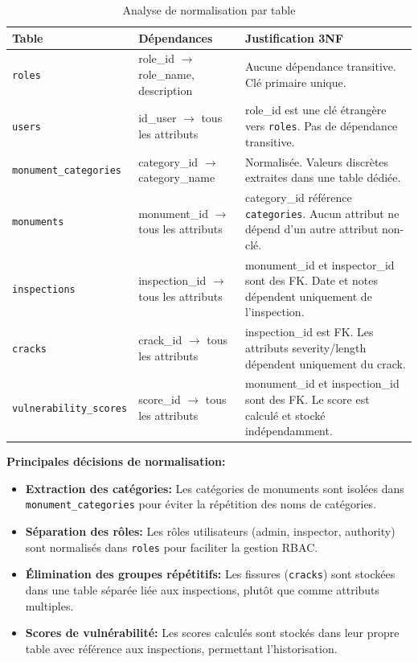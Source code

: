 \documentclass[12pt,a4paper]{article}
\begin{document}
\begin{table}[H]
\centering
\caption{Analyse de normalisation par table}
\label{tab:3nf-analysis}
\begin{tabular}{|p{3.5cm}|p{4cm}|p{5cm}|}
\hline
\textbf{Table} & \textbf{Dépendances} & \textbf{Justification 3NF} \\
\hline
\texttt{roles} & role\_id $\rightarrow$ role\_name, description & Aucune dépendance transitive. Clé primaire unique. \\
\hline
\texttt{users} & id\_user $\rightarrow$ tous les attributs & role\_id est une clé étrangère vers \texttt{roles}. Pas de dépendance transitive. \\
\hline
\texttt{monument\_categories} & category\_id $\rightarrow$ category\_name & Normalisée. Valeurs discrètes extraites dans une table dédiée. \\
\hline
\texttt{monuments} & monument\_id $\rightarrow$ tous les attributs & category\_id référence \texttt{categories}. Aucun attribut ne dépend d'un autre attribut non-clé. \\
\hline
\texttt{inspections} & inspection\_id $\rightarrow$ tous les attributs & monument\_id et inspector\_id sont des FK. Date et notes dépendent uniquement de l'inspection. \\
\hline
\texttt{cracks} & crack\_id $\rightarrow$ tous les attributs & inspection\_id est FK. Les attributs severity/length dépendent uniquement du crack. \\
\hline
\texttt{vulnerability\_scores} & score\_id $\rightarrow$ tous les attributs & monument\_id et inspection\_id sont des FK. Le score est calculé et stocké indépendamment. \\
\hline
\end{tabular}
\end{table}

\textbf{Principales décisions de normalisation:}
\begin{itemize}
    \item \textbf{Extraction des catégories:} Les catégories de monuments sont isolées dans \texttt{monument\_categories} pour éviter la répétition des noms de catégories.
    \item \textbf{Séparation des rôles:} Les rôles utilisateurs (admin, inspector, authority) sont normalisés dans \texttt{roles} pour faciliter la gestion RBAC.
    \item \textbf{Élimination des groupes répétitifs:} Les fissures (\texttt{cracks}) sont stockées dans une table séparée liée aux inspections, plutôt que comme attributs multiples.
    \item \textbf{Scores de vulnérabilité:} Les scores calculés sont stockés dans leur propre table avec référence aux inspections, permettant l'historisation.
\end{itemize}
\end{document}
